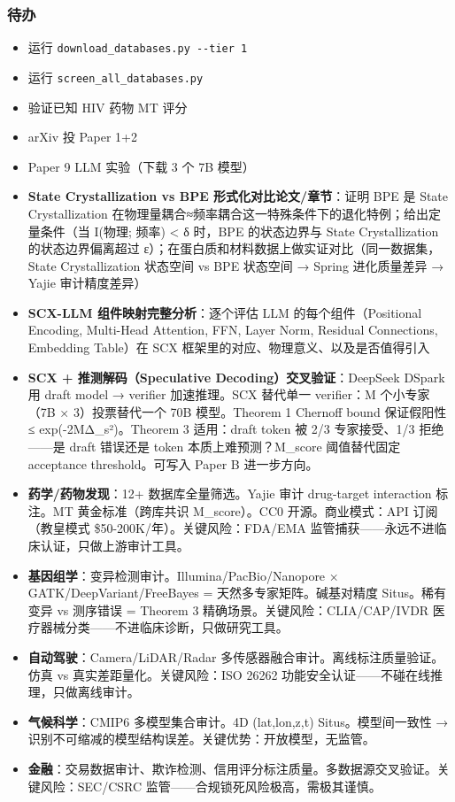 \documentclass[
  12pt,
]{ctexart}
\providecommand{\tightlist}{%
  \setlength{\itemsep}{0pt}\setlength{\parskip}{0pt}}
\begin{document}
\subsubsection{待办}\label{ux5f85ux529e}

\begin{itemize}
\tightlist
\item[$\square$]
  运行 \texttt{download\_databases.py\ -\/-tier\ 1}
\item[$\square$]
  运行 \texttt{screen\_all\_databases.py}
\item[$\square$]
  验证已知 HIV 药物 MT 评分
\item[$\square$]
  arXiv 投 Paper 1+2
\item[$\square$]
  Paper 9 LLM 实验（下载 3 个 7B 模型）
\item[$\square$]
  \textbf{State Crystallization vs BPE 形式化对比论文/章节}：证明 BPE 是
  State Crystallization
  在物理量耦合≈频率耦合这一特殊条件下的退化特例；给出定量条件（当
  I(物理; 频率) \textless{} δ 时，BPE 的状态边界与 State Crystallization
  的状态边界偏离超过
  ε）；在蛋白质和材料数据上做实证对比（同一数据集，State Crystallization
  状态空间 vs BPE 状态空间 → Spring 进化质量差异 → Yajie 审计精度差异）
\item[$\square$]
  \textbf{SCX-LLM 组件映射完整分析}：逐个评估 LLM 的每个组件（Positional
  Encoding, Multi-Head Attention, FFN, Layer Norm, Residual Connections,
  Embedding Table）在 SCX 框架里的对应、物理意义、以及是否值得引入
\item[$\square$]
  \textbf{SCX + 推测解码（Speculative Decoding）交叉验证}：DeepSeek
  DSpark 用 draft model → verifier 加速推理。SCX 替代单一 verifier：M
  个小专家（7B × 3）投票替代一个 70B 模型。Theorem 1 Chernoff bound
  保证假阳性 ≤ exp(-2MΔ\_s²)。Theorem 3 适用：draft token 被 2/3
  专家接受、1/3 拒绝------是 draft 错误还是 token 本质上难预测？M\_score
  阈值替代固定 acceptance threshold。可写入 Paper B 进一步方向。
\item[$\square$]
  \textbf{药学/药物发现}：12+ 数据库全量筛选。Yajie 审计 drug-target
  interaction 标注。MT 黄金标准（跨库共识 M\_score）。CC0
  开源。商业模式：API 订阅（教皇模式 \$50-200K/年）。关键风险：FDA/EMA
  监管捕获------永远不进临床认证，只做上游审计工具。
\item[$\square$]
  \textbf{基因组学}：变异检测审计。Illumina/PacBio/Nanopore ×
  GATK/DeepVariant/FreeBayes = 天然多专家矩阵。碱基对精度
  Situs。稀有变异 vs 测序错误 = Theorem 3
  精确场景。关键风险：CLIA/CAP/IVDR
  医疗器械分类------不进临床诊断，只做研究工具。
\item[$\square$]
  \textbf{自动驾驶}：Camera/LiDAR/Radar
  多传感器融合审计。离线标注质量验证。仿真 vs
  真实差距量化。关键风险：ISO 26262
  功能安全认证------不碰在线推理，只做离线审计。
\item[$\square$]
  \textbf{气候科学}：CMIP6 多模型集合审计。4D (lat,lon,z,t)
  Situs。模型间一致性 →
  识别不可缩减的模型结构误差。关键优势：开放模型，无监管。
\item[$\square$]
  \textbf{金融}：交易数据审计、欺诈检测、信用评分标注质量。多数据源交叉验证。关键风险：SEC/CSRC
  监管------合规锁死风险极高，需极其谨慎。
\end{itemize}
\end{document}
